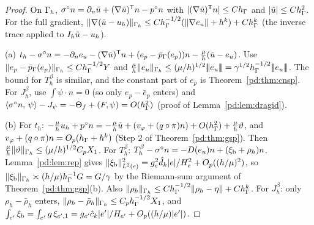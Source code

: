 \begin{proof}
On $\Gamma_h$, $\sigma^\circ n=\partial_n\tilde u+(\nabla\tilde u)^{\mathsf T}n-p^\circ n$ with $|(\nabla\tilde u)^{\mathsf T}n|\le Ch_\Gamma$ and $|\tilde u|\le Ch_\Gamma^2$. For the full gradient, $\lVert \nabla(\tilde u-u_h)\rVert_{\Gamma_h}\le Ch_\Gamma^{-1/2}(\lVert \nabla e_u\rVert+h^k)+Ch_\Gamma^k$ (the inverse trace applied to $I_h\tilde u-u_h$).

(a) $t_h-\sigma^\circ n=-\partial_n e_u-(\nabla\tilde u)^{\mathsf T}n+(e_p-\bar p_{\Gamma}(e_p))n-\frac\mu h(\tilde u-e_u)$. Use $\lVert e_p-\bar p_{\Gamma}(e_p)\rVert_{\Gamma_h}\le Ch_\Gamma^{-1/2}Y$ and $\frac\mu h\norm{e_u}_{\Gh}\le(\mu/h)^{1/2}\tnorm{e_u}=\gamma^{1/2}\hG^{-1/2}\tnorm{e_u}$. The bound for $T^\beta_h$ is similar, and the constant part of $e_p$ is Theorem~\ref{pd:thm:cnsp}. For $J^\beta_h$, use $\int\psi\cdot n=0$ (so only $e_p-\bar e_p$ enters) and $\langle \sigma^\circ n,\, \psi\rangle-J_\psi=-\Theta_f+(F,\psi)=O(h_\Gamma^2)$ (proof of Lemma~\ref{pd:lem:dragid}).

(b) For $t_h$: $-\frac\mu hu_h+p^\circ n=-\frac\mu h\tilde u+(v_\varphi+(q\circ\pi)n)+O(h_\Gamma^2)+\frac\mu h\vartheta$, and $v_\varphi+(q\circ\pi)n=O_p(h_\Gamma+h^k)$ (Step 2 of Theorem~\ref{pd:thm:gsp}). Then $\frac\mu h\lVert \vartheta\rVert_{\Gamma_h}\le(\mu/h)^{1/2}C_pX_1$. For $T^\beta_h$: $T^\beta_h-\sigma^\circ n=-D(e_u)n+(\xi_{\mathrm b}+\rho_h)n$. Lemma~\ref{pd:lem:rep} gives $\lVert \xi_{\mathrm b}\rVert^2_{L^2(e)}=g_e^2\hat d_k|e|/H_e^2+O_p((h/\mu)^2)$, so $\lVert \xi_{\mathrm b}\rVert_{\Gamma_h}\asymp(h/\mu)h_\Gamma^{-1}G=G/\gamma$ by the Riemann-sum argument of Theorem~\ref{pd:thm:gsp}(b). Also $\lVert \rho_h\rVert_{\Gamma_h}\le Ch_\Gamma^{-1/2}\lVert \rho_h-\eta\rVert+Ch_\Gamma^k$. For $J^\beta_h$: only $\rho_h-\bar\rho_h$ enters, $\lVert \rho_h-\bar\rho_h\rVert_{\Gamma_h}\le C_ph_\Gamma^{-1/2}X_1$, and $\int_{e'}\xi_{\mathrm b}=\int_{e'}g\,\xi_{e',1}=g_{e'}\hat c_k|e'|/H_{e'}+O_p((h/\mu)|e'|)$.
\end{proof}

